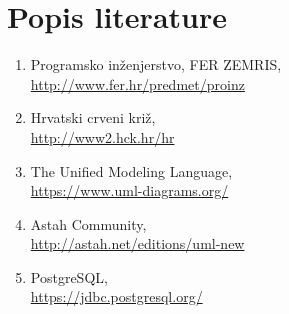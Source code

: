 \chapter*{Popis literature}
	 	
		
		
		\begin{enumerate}
			
			
			\item  Programsko inženjerstvo, FER ZEMRIS,\\ \url{http://www.fer.hr/predmet/proinz}
			
			\item  Hrvatski crveni križ,\\
			\url{http://www2.hck.hr/hr}
			
			\item  The Unified Modeling Language,\\ \url{https://www.uml-diagrams.org/}
			
			\item  Astah Community, \\
			\url{http://astah.net/editions/uml-new}
			
			\item  PostgreSQL, \\
			\url{https://jdbc.postgresql.org/}
			
			
		\end{enumerate}
		
		 